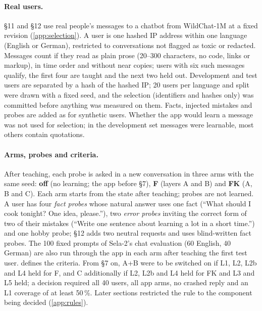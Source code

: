 \documentclass[10pt,twocolumn]{article}
\newcommand{\pct}{\,\%}
\begin{document}
\paragraph{Real users.} \S11 and \S12 use real people's messages to a chatbot from WildChat-1M
\citep{zhao2024wildchat} at a fixed revision (\cref{app:selection}). A user is one hashed IP address within one language
(English or German), restricted to conversations not flagged as toxic or redacted. Messages count if they read as plain
prose (20--300 characters, no code, links or markup), in time order and without near copies; users with six such
messages qualify, the first four are taught and the next two held out. Development and test users are separated by a
hash of the hashed IP; 20 users per language and split were drawn with a fixed seed, and the selection (identifiers and
hashes only) was committed before anything was measured on them. Facts, injected mistakes and probes are added as for
synthetic users. Whether the app would learn a message was not used for selection; in the development set
 messages were learnable, most others contain quotations.

\paragraph{Arms, probes and criteria.} After teaching, each probe is asked in a new conversation in three arms with the
same seed: \textbf{off} (no learning; the app before \S7), \textbf{F} (layers A and B) and \textbf{FK} (A, B and C). Each
arm starts from the state after teaching; probes are not learned. A user has four \emph{fact probes} whose natural answer
uses one fact (``What should I cook tonight? One idea, please.''), two \emph{error probes} inviting the correct form of
two of their mistakes (``Write one sentence about learning a lot in a short time.'') and one hobby probe; \S12 adds two
neutral requests and uses blind-written fact probes. The 100 fixed prompts of Sela-2's chat evaluation (60 English, 40
German) are also run through the app in each arm after teaching the first test user.  defines the
criteria. From \S7 on, A+B were to be switched on if L1, L2, L2b and L4 held for F, and C additionally if L2, L2b and L4
held for FK and L3 and L5 held; a decision required all 40 users, all app arms, no crashed reply and an L1 coverage of at
least 50\pct. Later sections restricted the rule to the component being decided (\cref{app:rules}).
\end{document}
